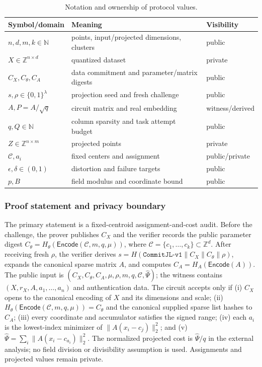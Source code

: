 \documentclass[pdflatex,sn-mathphys-num,iicol]{sn-jnl}
\newcommand{\tpexplain}[1]{}
\theoremstyle{plain}
\theoremstyle{definition}
\theoremstyle{remark}
\begin{document}
\begin{table}[!htbp]
\caption{Notation and ownership of protocol values.}\label{tab:notation}
\centering\scriptsize
\begin{tabularx}{\columnwidth}{@{}Y Y Y@{}}
\toprule
Symbol/domain & Meaning & Visibility \\
\midrule
$n,d,m,k\in\mathbb N$ & points, input/projected dimensions, clusters & public \\
$X\in\mathbb Z^{n\times d}$ & quantized dataset & private \\
$C_X,C_\theta,C_A$ & data commitment and parameter/matrix digests & public \\
$s,\rho\in\{0,1\}^{\lambda}$ & projection seed and fresh challenge & public \\
$A,P=A/\sqrt q$ & circuit matrix and real embedding & witness/derived \\
$q,Q\in\mathbb N$ & column sparsity and task attempt budget & public \\
$Z\in\mathbb Z^{n\times m}$ & projected points & private \\
$\mathcal C,a_i$ & fixed centers and assignment & public/private \\
$\epsilon,\delta\in(0,1)$ & distortion and failure targets & public \\
$p,B$ & field modulus and coordinate bound & public \\
\bottomrule
\end{tabularx}
\end{table}

\subsubsection{Proof statement and privacy boundary}
\tpexplain{Paragraph 1 --- state the exact NP relation. Avoid saying “prove clustering” without specifying public input, witness, algorithm steps, iteration count, and tie-breaking.}
The primary statement is a fixed-centroid assignment-and-cost audit. Before the challenge, the prover publishes $C_X$ and the verifier records the public parameter digest $C_\theta=H_\theta(\mathsf{Encode}(\mathcal C,m,q,\mu))$, where $\mathcal{C}=\{c_1,\ldots,c_k\}\subset\mathbb Z^d$. After receiving fresh $\rho$, the verifier derives $s=H(\texttt{CommitJL-v1}\|C_X\|C_\theta\|\rho)$, expands the canonical sparse matrix $A$, and computes $C_A=H_A(\mathsf{Encode}(A))$. The public input is $(C_X,C_\theta,C_A,\mu,\rho,m,q,\mathcal C,\widehat\Psi)$; the witness contains $(X,r_X,A,a_1,\ldots,a_n)$ and authentication data. The circuit accepts only if (i) $C_X$ opens to the canonical encoding of $X$ and its dimensions and scale; (ii) $H_\theta(\mathsf{Encode}(\mathcal C,m,q,\mu))=C_\theta$ and the canonical supplied sparse list hashes to $C_A$; (iii) every coordinate and accumulator satisfies the signed range; (iv) each $a_i$ is the lowest-index minimizer of $\|A(x_i-c_j)\|_2^2$; and (v) $\widehat\Psi=\sum_i\|A(x_i-c_{a_i})\|_2^2$. The normalized projected cost is $\widehat\Psi/q$ in the external analysis; no field division or divisibility assumption is used. Assignments and projected values remain private.
\end{document}
